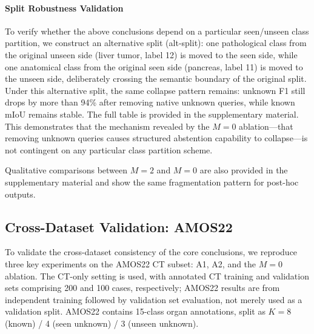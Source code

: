 \documentclass[journal]{IEEEtai}
\begin{document}
\paragraph{Split Robustness Validation}
To verify whether the above conclusions depend on a particular seen/unseen class
partition, we construct an alternative split (alt-split): one pathological class from
the original unseen side (liver tumor, label 12) is moved to the seen side, while
one anatomical class from the original seen side (pancreas, label 11) is moved to the
unseen side, deliberately crossing the semantic boundary of the original split.
Under this alternative split, the same collapse pattern remains: unknown F1 still drops
by more than 94\% after removing native unknown queries, while known mIoU remains
stable. The full table is provided in the supplementary material.
This demonstrates that the mechanism revealed by the $M=0$ ablation---that removing
unknown queries causes structured abstention capability to collapse---is
not contingent on any particular class partition scheme.

Qualitative comparisons between $M=2$ and $M=0$ are also provided in the
supplementary material and show the same fragmentation pattern for post-hoc outputs.


\subsection{Cross-Dataset Validation: AMOS22}\label{sec:exp:cross}

To validate the cross-dataset consistency of the core conclusions, we reproduce three
key experiments on the AMOS22 CT subset: A1, A2, and the $M=0$ ablation.
The CT-only setting is used, with annotated CT training and validation sets comprising
200 and 100 cases, respectively; AMOS22 results are from independent training followed
by validation set evaluation, not merely used as a validation split.
AMOS22 contains 15-class organ annotations, split as $K=8$ (known) / 4 (seen unknown) /
3 (unseen unknown).
\end{document}
